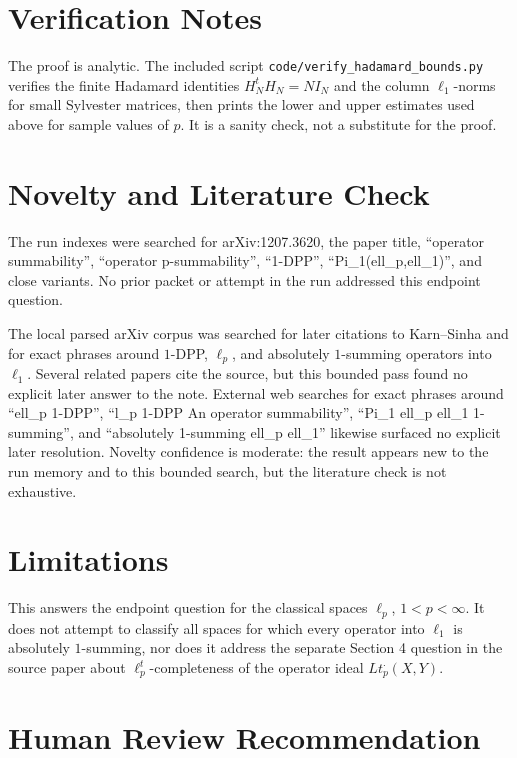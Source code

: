 \documentclass[11pt]{article}
\begin{document}
\section*{Verification Notes}

The proof is analytic.  The included script
\texttt{code/verify\_hadamard\_bounds.py} verifies the finite Hadamard
identities \(H_N^tH_N=NI_N\) and the column \(\ell_1\)-norms for small
Sylvester matrices, then prints the lower and upper estimates used above for
sample values of \(p\).  It is a sanity check, not a substitute for the proof.

\section*{Novelty and Literature Check}

The run indexes were searched for arXiv:1207.3620, the paper title,
``operator summability'', ``operator p-summability'', ``1-DPP'',
``Pi\_1(ell\_p,ell\_1)'', and close variants.  No prior packet or attempt in
the run addressed this endpoint question.

The local parsed arXiv corpus was searched for later citations to Karn--Sinha
and for exact phrases around \(1\)-DPP, \(\ell_p\), and absolutely
\(1\)-summing operators into \(\ell_1\).  Several related papers cite the
source, but this bounded pass found no explicit later answer to the note.
External web searches for exact phrases around ``ell\_p 1-DPP'', ``l\_p
1-DPP An operator summability'', ``Pi\_1 ell\_p ell\_1 1-summing'', and
``absolutely 1-summing ell\_p ell\_1'' likewise surfaced no explicit later
resolution.  Novelty confidence is moderate: the result appears new to the
run memory and to this bounded search, but the literature check is not
exhaustive.

\section*{Limitations}

This answers the endpoint question for the classical spaces \(\ell_p\),
\(1<p<\infty\).  It does not attempt to classify all spaces for which every
operator into \(\ell_1\) is absolutely \(1\)-summing, nor does it address the
separate Section 4 question in the source paper about \(\ell_p^t\)-completeness
of the operator ideal \(Lt_p^\cdot(X,Y)\).

\section*{Human Review Recommendation}
\end{document}
